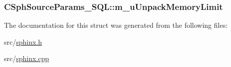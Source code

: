 \hypertarget{structCSphSourceParams__SQL_a7babd5f68bfa34fe7e64e59aafcebd53}{
\subsubsection[{m\-\_\-u\-Unpack\-Memory\-Limit}]{ C\-Sph\-Source\-Params\-\_\-\-S\-Q\-L\-::m\-\_\-u\-Unpack\-Memory\-Limit}}\label{structCSphSourceParams__SQL_a7babd5f68bfa34fe7e64e59aafcebd53}


The documentation for this struct was generated from the following files\-:\begin{DoxyCompactItemize}
\item 
src/\hyperlink{sphinx_8h}{sphinx.\-h}\item 
src/\hyperlink{sphinx_8cpp}{sphinx.\-cpp}\end{DoxyCompactItemize}
